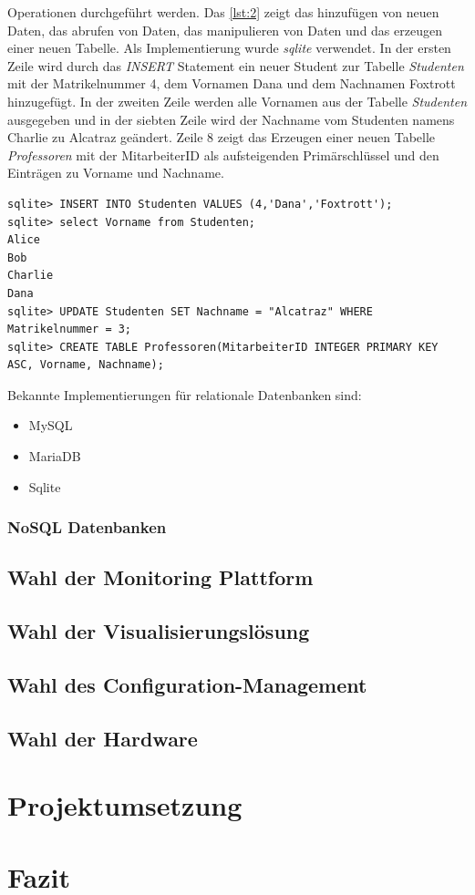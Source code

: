\documentclass[titlepage]{report}
\begin{document}
Operationen durchgeführt werden. Das \autoref{lst:2} zeigt das hinzufügen von neuen
Daten, das abrufen von Daten, das manipulieren von Daten und das
erzeugen einer neuen Tabelle. Als Implementierung wurde \emph{sqlite}
verwendet. In der ersten Zeile wird durch das \emph{INSERT} Statement
ein neuer Student zur Tabelle \emph{Studenten} mit der Matrikelnummer 4,
dem Vornamen Dana und dem Nachnamen Foxtrott hinzugefügt. In der zweiten
Zeile werden alle Vornamen aus der Tabelle \emph{Studenten}
ausgegeben und in der siebten Zeile wird der Nachname vom Studenten
namens Charlie zu Alcatraz geändert. Zeile 8 zeigt das Erzeugen einer
neuen Tabelle \emph{Professoren} mit der MitarbeiterID als
aufsteigenden Primärschlüssel und den Einträgen zu Vorname und Nachname.
\begin{minipage}{\linewidth}
\begin{lstlisting}[caption={Verwendung von Structured Query Language},label={lst:2}]
sqlite> INSERT INTO Studenten VALUES (4,'Dana','Foxtrott');
sqlite> select Vorname from Studenten;
Alice
Bob
Charlie
Dana
sqlite> UPDATE Studenten SET Nachname = "Alcatraz" WHERE Matrikelnummer = 3;
sqlite> CREATE TABLE Professoren(MitarbeiterID INTEGER PRIMARY KEY ASC, Vorname, Nachname);
\end{lstlisting}
\end{minipage}
Bekannte Implementierungen für relationale Datenbanken sind:
\begin{itemize}
    \item MySQL
    \item MariaDB
    \item Sqlite
\end{itemize}
\subsection*{NoSQL Datenbanken}
\section*{Wahl der Monitoring Plattform}
\section*{Wahl der Visualisierungslösung}
\section*{Wahl des Configuration-Management}
\section*{Wahl der Hardware}
\chapter*{Projektumsetzung}
\chapter*{Fazit}
\nocite{*}
\printbibliography{}
\lstlistoflistings{}
\listoffigures
\printglossary{}
\end{document}
